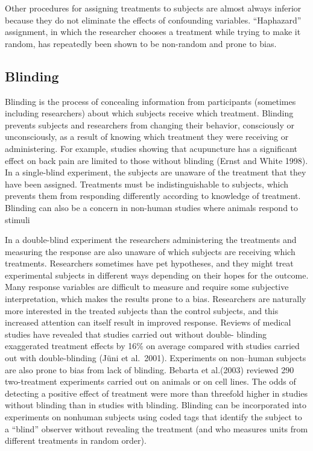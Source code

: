 \documentclass[]{book}
\begin{document}
Other procedures for assigning treatments to subjects are almost always inferior because they do not eliminate the effects of confounding variables. ``Haphazard'' assignment, in which the researcher chooses a treatment while trying to make it random, has repeatedly been shown to be non-random and prone to bias.

\hypertarget{blinding}{%
\subsection{Blinding}\label{blinding}}

Blinding is the process of concealing information from participants (sometimes including researchers) about which subjects receive which treatment. Blinding prevents subjects and researchers from changing their behavior, consciously or unconsciously, as a result of knowing which treatment they were receiving or administering. For example, studies showing that acupuncture has a significant effect on back pain are limited to those without blinding (Ernst and White 1998). In a single-blind experiment, the subjects are unaware of the treatment that they have been assigned. Treatments must be indistinguishable to subjects, which prevents them from responding differently according to knowledge of treatment. Blinding can also be a concern in non-human studies where animals respond to stimuli

In a double-blind experiment the researchers administering the treatments and measuring the response are also unaware of which subjects are receiving which treatments. Researchers sometimes have pet hypotheses, and they might treat experimental subjects in different ways depending on their hopes for the outcome. Many response variables are difficult to measure and require some subjective interpretation, which makes the results prone to a bias. Researchers are naturally more interested in the treated subjects than the control subjects, and this increased attention can itself result in improved response. Reviews of medical studies have revealed that studies carried out without double- blinding exaggerated treatment effects by 16\% on average compared with studies carried out with double-blinding (Jüni et al.~2001). Experiments on non--human subjects are also prone to bias from lack of blinding. Bebarta et al.(2003) reviewed 290 two-treatment experiments carried out on animals or on cell lines. The odds of detecting a positive effect of treatment were more than threefold higher in studies without blinding than in studies with blinding. Blinding can be incorporated into experiments on nonhuman subjects using coded tags that identify the subject to a ``blind'' observer without revealing the treatment (and who measures units from different treatments in random order).
\end{document}
